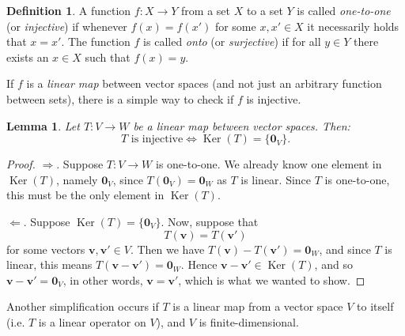 \documentclass[a4paper,11pt]{book}
\newtheorem{lemma}[theorem]{Lemma}
\theoremstyle{definition}
\newtheorem{definition}[theorem]{Definition}
\newcommand{\ve}[1]{\mathbf{#1}}
\DeclareMathOperator{\Ker}{Ker}
\begin{document}
\begin{definition} A function $f : X \rightarrow Y$ from a set $X$ to a set $Y$ is called {\em one-to-one} (or {\em injective}) if whenever $f(x) = f(x')$ for some $x, x' \in X$ it necessarily holds that $x = x'$. The function $f$ is called {\em onto} (or {\em surjective}) if for all $y \in Y$ there exists an $x \in X$ such that $f(x) = y$.
\end{definition}

If $f$ is a {\em linear map} between vector spaces (and not just an arbitrary function between sets), there is a simple way to check if $f$ is injective.

\begin{lemma} \label{injective-kernel-lemma} Let $T : V \rightarrow W$ be a linear map between vector spaces. Then:
\[
 \mbox{$T$ is injective} \Longleftrightarrow \mbox{$\Ker(T) = \{\ve{0}_V\}$}.
\]
\end{lemma}
\begin{proof} $\Rightarrow$. Suppose $T : V \rightarrow W$ is one-to-one. We already know one element in $\Ker(T)$, namely $\ve{0}_V$, since $T(\ve{0}_V) = \ve{0}_W$ as $T$ is linear. Since $T$ is one-to-one, this must be the only element in $\Ker(T)$.

$\Leftarrow$. Suppose $\Ker(T) = \{\ve{0}_V\}$. Now, suppose that 
\[
T(\ve{v}) = T(\ve{v}')
\]
for some vectors $\ve{v}, \ve{v}' \in V$.  Then we have $T(\ve{v}) - T(\ve{v}') = \ve{0}_W$, and since $T$ is linear, this means $T(\ve{v} - \ve{v}') = \ve{0}_W$. Hence $\ve{v} - \ve{v}' \in \Ker(T)$, and so $\ve{v} - \ve{v}' = \ve{0}_V$, in other words, $\ve{v} = \ve{v}'$, which is what we wanted to show.
\end{proof}

Another simplification occurs if $T$ is a linear map from a vector space $V$ to itself (i.e. $T$ is a linear operator on $V$), and $V$ is finite-dimensional.
\end{document}
